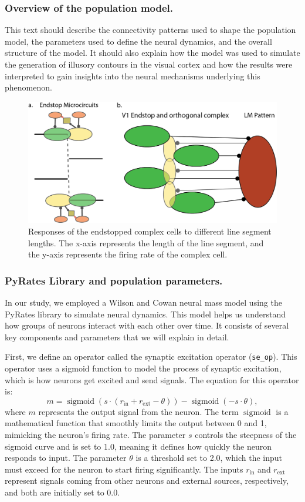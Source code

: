 \documentclass[12pt]{article}
\begin{document}
\subsubsection{Overview of the population model.}
This text should describe the connectivity patterns used to shape the population model, the parameters used to define the neural dynamics, and the overall structure of the model. It should also explain how the model was used to simulate the generation of illusory contours in the visual cortex and how the results were interpreted to gain insights into the neural mechanisms underlying this phenomenon.

\begin{figure}[H]
  \centering
  \includegraphics[width=1 \textwidth]{./figures/illusory_filling.png}
  \caption{Responses of the endstopped complex cells to different line segment lengths. The x-axis represents the length of the line segment, and the y-axis represents the firing rate of the complex cell.}
  \label{fig:illusory_filling}
\end{figure}


\subsubsection{PyRates Library and population parameters.}
In our study, we employed a Wilson and Cowan neural mass model using the PyRates library to simulate neural dynamics. This model helps us understand how groups of neurons interact with each other over time. It consists of several key components and parameters that we will explain in detail.

First, we define an operator called the synaptic excitation operator (\texttt{se\_op}). This operator uses a sigmoid function to model the process of synaptic excitation, which is how neurons get excited and send signals. The equation for this operator is:
\[
m = \operatorname{sigmoid}(s \cdot (r_{\mathrm{in}} + r_{\mathrm{ext}} - \theta)) - \operatorname{sigmoid}(-s \cdot \theta),
\]
where \( m \) represents the output signal from the neuron. The term \(\operatorname{sigmoid}\) is a mathematical function that smoothly limits the output between 0 and 1, mimicking the neuron's firing rate. The parameter \( s \) controls the steepness of the sigmoid curve and is set to 1.0, meaning it defines how quickly the neuron responds to input. The parameter \(\theta\) is a threshold set to 2.0, which the input must exceed for the neuron to start firing significantly. The inputs \( r_{\mathrm{in}} \) and \( r_{\mathrm{ext}} \) represent signals coming from other neurons and external sources, respectively, and both are initially set to 0.0.
\end{document}
